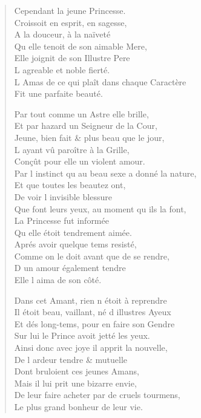 \begin{verse}
\vin Cependant la jeune Princesse. \\
\vin Croissoit en esprit, en sagesse, \\
\vin A la douceur, à la naïveté \\
\vin Qu\textquotesingle{} elle tenoit de son aimable Mere, \\
\vin Elle joignit de son Illustre Pere \\
\vin L\textquotesingle{} agreable et noble fierté. \\
L\textquotesingle{} Amas de ce qui plaît dans chaque Caractère \\
\vin Fit une parfaite beauté.

\vin Par tout comme un Astre elle brille, \\
\vin Et par hazard un Seigneur de la Cour, \\
\vin Jeune, bien fait \& plus beau que le jour, \\
\vin L\textquotesingle{} ayant vû paroître à la Grille, \\
\vin Conçût pour elle un violent amour. \\
Par l\textquotesingle{} instinct qu\textquotesingle{} au beau sexe a donné la nature, \\
\vin Et que toutes les beautez ont, \\
\vin De voir l\textquotesingle{} invisible blessure \\
Que font leurs yeux, au moment qu\textquotesingle{} ils la font, \\
\vin La Princesse fut informée \\
\vin Qu\textquotesingle{} elle étoit tendrement aimée. \\
\vin Aprés avoir quelque tems resisté, \\
\vin Comme on le doit avant que de se rendre, \\
\vin D\textquotesingle{} un amour également tendre \\
\vin Elle l\textquotesingle{} aima de son côté.

\vin Dans cet Amant, rien n\textquotesingle{} étoit à reprendre \\
Il étoit beau, vaillant, né d\textquotesingle{} illustres Ayeux \\
\vin Et dés long-tems, pour en faire son Gendre \\
\vin Sur lui le Prince avoit jetté les yeux. \\
Ainsi donc avec joye il apprit la nouvelle, \\
\vin De l\textquotesingle{} ardeur tendre \& mutuelle \\
\vin Dont bruloient ces jeunes Amans, \\
\vin Mais il lui prit une bizarre envie, \\
De leur faire acheter par de cruels tourmens, \\
\vin Le plus grand bonheur de leur vie.


\end{verse}
